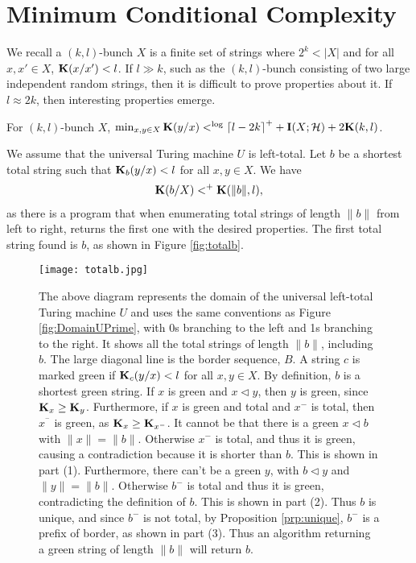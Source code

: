 \documentclass[11pt]{article}\textwidth 6.5in\textheight 9in
\begin{document}
\section{Minimum Conditional Complexity}
\label{sec:bunch}	
We recall a $(k,l)$-bunch $X$ is a finite set of strings where $2^k< |X|$ and for all $x,x'\in X$, ${\mathbf K}(x/x')< l$. If $l\gg k$, such as the $(k,l)$-bunch consisting of two large independent random strings, then it is difficult to prove properties about it. If $l\approx 2k$, then interesting properties emerge.
\begin{thr}
	\label{thr:klset}
	For $(k,l)$-bunch $X$, $\min_{x,y\in X}{\mathbf K}(y/x)<^{\log} {\lceil l-2k\rceil}^++{\mathbf I}(X;{\mathcal H})+2{\mathbf K}(k,l)$.
\end{thr}
\begin{prf}
	We assume that the universal Turing machine $U$ is left-total. Let $b$ be a shortest total string such that ${\mathbf K}_b(y/x)< l$ for all $x,y\in X$.  We have
	\begin{align}
	\label{eq:bX}
	{\mathbf K}(b/X)<^+ {\mathbf K}(\|b\|,l), 
	\end{align}
	as there is a program that when enumerating total strings of length $\|b\|$ from left to right, returns the first one with the desired properties. The first total string found is $b$, as shown in Figure \ref{fig:totalb}.
		\begin{figure}               
  \centering
  \texttt{[image: totalb.jpg]}
  \caption{The above diagram represents the domain of the universal left-total Turing machine $U$ and uses the same conventions as Figure \ref{fig:DomainUPrime}, with 0s branching to the left and 1s branching to the right. It shows all the total strings of length $\|b\|$, including $b$. The large diagonal  line is the border sequence, $B$. A string $c$ is marked green if ${\mathbf K}_c(y/x)<l$ for all $x,y \in X$. By definition, $b$ is a shortest green string. If $x$ is green and $x\lhd y$, then $y$ is green, since ${\mathbf K}_x\geq {\mathbf K}_y$. Furthermore, if $x$ is green and total and $x^-$ is total, then $x^^-$ is green,  as ${\mathbf K}_x\geq {\mathbf K}_{x^-}$. It cannot be that there is a green $x\lhd b$ with $\|x\|=\|b\|$. Otherwise $x^-$ is total, and thus it is green, causing a contradiction because it is shorter than $b$. This is shown in part (1). Furthermore, there can’t be a green $y$, with  $b\lhd y$ and $\|y\|=\|b\|$. Otherwise $b^-$ is total and thus it is green, contradicting the definition of $b$. This is shown in part (2). Thus $b$ is unique, and since $b^-$ is not total, by Proposition \ref{prp:unique}, $b^-$ is a prefix of border, as shown in part (3). Thus an algorithm returning a green string of length $\|b\|$ will return $b$.}

\end{figure}
\end{prf}
\end{document}
